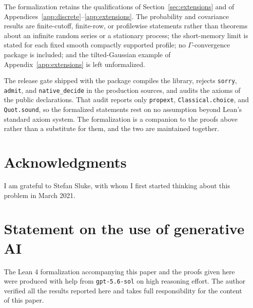 \documentclass[11pt]{amsart}
\theoremstyle{definition}
\theoremstyle{remark}
\begin{document}
The formalization retains the qualifications of Section~\ref{sec:extensions} and
of Appendices~\ref{app:discrete}--\ref{app:extensions}. The probability and
covariance results are finite-cutoff, finite-row, or profilewise statements
rather than theorems about an infinite random series or a stationary process;
the short-memory limit is stated for each fixed smooth compactly supported
profile; no $\Gamma$-convergence package is included; and the tilted-Gaussian
example of Appendix~\ref{app:extensions} is left unformalized.

The release gate shipped with the package compiles the library, rejects
\texttt{sorry}, \texttt{admit}, and \texttt{native\_decide} in the production
sources, and audits the axioms of the public declarations. That audit reports
only \texttt{propext}, \texttt{Classical.choice}, and \texttt{Quot.sound}, so the
formalized statements rest on no assumption beyond Lean's standard axiom
system. The formalization is a companion to the proofs above rather than a
substitute for them, and the two are maintained together.

\section*{Acknowledgments}

I am grateful to Stefan Sluke, with whom I first started thinking about this problem in March 2021.

\section*{Statement on the use of generative AI}

The Lean 4 formalization accompanying this paper and the proofs given here were
produced with help from \texttt{gpt-5.6-sol} on high reasoning effort. The
author verified all the results reported here and takes full responsibility for
the content of this paper.
\end{document}
